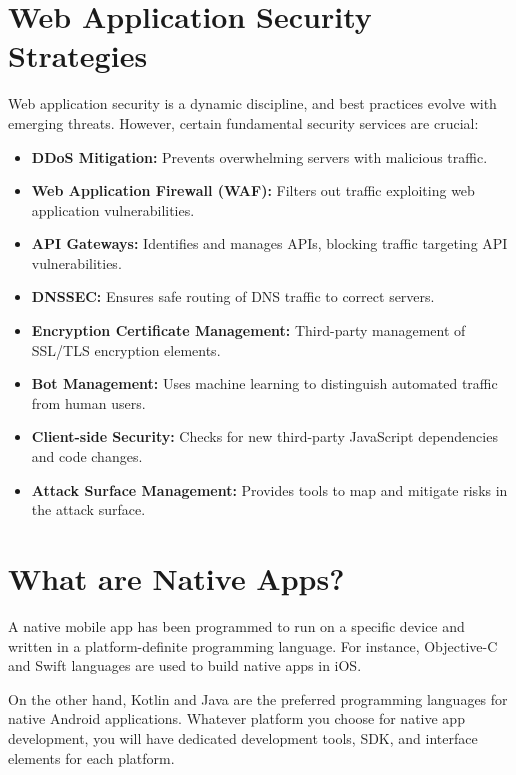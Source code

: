 \documentclass[conference]{IEEEtran}
\begin{document}
\section{Web Application Security Strategies}
Web application security is a dynamic discipline, and best practices evolve with emerging threats. However, certain fundamental security services are crucial:

\begin{itemize}
    \item \textbf{DDoS Mitigation:} Prevents overwhelming servers with malicious traffic.
    
    \item \textbf{Web Application Firewall (WAF):} Filters out traffic exploiting web application vulnerabilities.
    
    \item \textbf{API Gateways:} Identifies and manages APIs, blocking traffic targeting API vulnerabilities.
    
    \item \textbf{DNSSEC:} Ensures safe routing of DNS traffic to correct servers.
    
    \item \textbf{Encryption Certificate Management:} Third-party management of SSL/TLS encryption elements.
    
    \item \textbf{Bot Management:} Uses machine learning to distinguish automated traffic from human users.
    
    \item \textbf{Client-side Security:} Checks for new third-party JavaScript dependencies and code changes.
    
    \item \textbf{Attack Surface Management:} Provides tools to map and mitigate risks in the attack surface.
\end{itemize}

\section{What are Native Apps?}
A native mobile app has been programmed to run on a specific device and written in a platform-definite programming language. For instance, Objective-C and Swift languages are used to build native apps in iOS.

On the other hand, Kotlin and Java are the preferred programming languages for native Android applications. Whatever platform you choose for native app development, you will have dedicated development tools, SDK, and interface elements for each platform.
\end{document}
